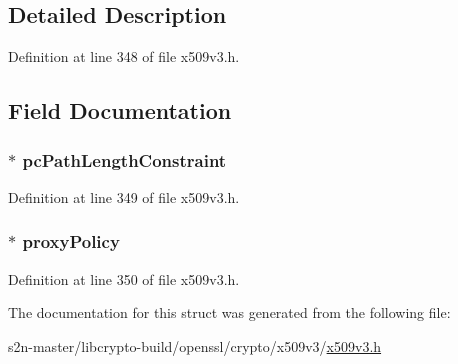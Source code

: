 \subsection{Detailed Description}


Definition at line 348 of file x509v3.\+h.



\subsection{Field Documentation}
\subsubsection[{\texorpdfstring{pc\+Path\+Length\+Constraint}{pcPathLengthConstraint}}]{ $\ast$ pc\+Path\+Length\+Constraint}\hypertarget{struct_p_r_o_x_y___c_e_r_t___i_n_f_o___e_x_t_e_n_s_i_o_n__st_a2dc7536cd57d0e405c0fe14ce9a5eb41}{}\label{struct_p_r_o_x_y___c_e_r_t___i_n_f_o___e_x_t_e_n_s_i_o_n__st_a2dc7536cd57d0e405c0fe14ce9a5eb41}


Definition at line 349 of file x509v3.\+h.

\subsubsection[{\texorpdfstring{proxy\+Policy}{proxyPolicy}}]{ $\ast$ proxy\+Policy}\hypertarget{struct_p_r_o_x_y___c_e_r_t___i_n_f_o___e_x_t_e_n_s_i_o_n__st_a26e27ddd709b05778b36002c36fee1c2}{}\label{struct_p_r_o_x_y___c_e_r_t___i_n_f_o___e_x_t_e_n_s_i_o_n__st_a26e27ddd709b05778b36002c36fee1c2}


Definition at line 350 of file x509v3.\+h.



The documentation for this struct was generated from the following file\+:\begin{DoxyCompactItemize}
\item 
s2n-\/master/libcrypto-\/build/openssl/crypto/x509v3/\hyperlink{crypto_2x509v3_2x509v3_8h}{x509v3.\+h}\end{DoxyCompactItemize}
